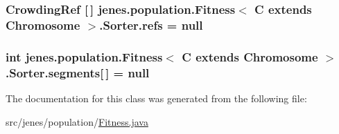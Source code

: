 \hypertarget{classjenes_1_1population_1_1_fitness_3_01_c_01extends_01_chromosome_01_4_1_1_sorter_afea619512a6254692e6dfb5fb07e7454}{
\subsubsection[{refs}]{\setlength{\rightskip}{0pt plus 5cm}Crowding\-Ref \mbox{[}$\,$\mbox{]} jenes.\-population.\-Fitness$<$ C extends Chromosome $>$.Sorter.\-refs = null\hspace{0.3cm}{\ttfamily [private]}}}\label{classjenes_1_1population_1_1_fitness_3_01_c_01extends_01_chromosome_01_4_1_1_sorter_afea619512a6254692e6dfb5fb07e7454}
\hypertarget{classjenes_1_1population_1_1_fitness_3_01_c_01extends_01_chromosome_01_4_1_1_sorter_a2e9dd639fc61868ac73a722a1e1d376b}{
\subsubsection[{segments}]{\setlength{\rightskip}{0pt plus 5cm}int jenes.\-population.\-Fitness$<$ C extends Chromosome $>$.Sorter.\-segments\mbox{[}$\,$\mbox{]} = null\hspace{0.3cm}{\ttfamily [private]}}}\label{classjenes_1_1population_1_1_fitness_3_01_c_01extends_01_chromosome_01_4_1_1_sorter_a2e9dd639fc61868ac73a722a1e1d376b}


The documentation for this class was generated from the following file\-:\begin{DoxyCompactItemize}
\item 
src/jenes/population/\hyperlink{_fitness_8java}{Fitness.\-java}\end{DoxyCompactItemize}
